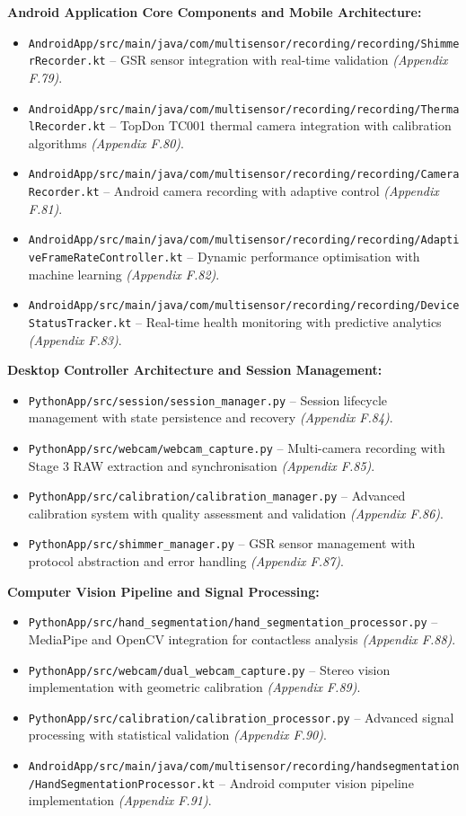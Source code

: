 \documentclass[11pt,a4paper]{report}
\begin{document}
\textbf{Android Application Core Components and Mobile Architecture:}
\begin{itemize}
  \item \texttt{AndroidApp/src/main/java/com/multisensor/recording/recording/ShimmerRecorder.kt} – GSR sensor integration with real-time validation \textit{(Appendix F.79)}.
  \item \texttt{AndroidApp/src/main/java/com/multisensor/recording/recording/ThermalRecorder.kt} – TopDon TC001 thermal camera integration with calibration algorithms \textit{(Appendix F.80)}.
  \item \texttt{AndroidApp/src/main/java/com/multisensor/recording/recording/CameraRecorder.kt} – Android camera recording with adaptive control \textit{(Appendix F.81)}.
  \item \texttt{AndroidApp/src/main/java/com/multisensor/recording/recording/AdaptiveFrameRateController.kt} – Dynamic performance optimisation with machine learning \textit{(Appendix F.82)}.
  \item \texttt{AndroidApp/src/main/java/com/multisensor/recording/recording/DeviceStatusTracker.kt} – Real-time health monitoring with predictive analytics \textit{(Appendix F.83)}.
\end{itemize}

\textbf{Desktop Controller Architecture and Session Management:}
\begin{itemize}
  \item \texttt{PythonApp/src/session/session\_manager.py} – Session lifecycle management with state persistence and recovery \textit{(Appendix F.84)}.
  \item \texttt{PythonApp/src/webcam/webcam\_capture.py} – Multi-camera recording with Stage 3 RAW extraction and synchronisation \textit{(Appendix F.85)}.
  \item \texttt{PythonApp/src/calibration/calibration\_manager.py} – Advanced calibration system with quality assessment and validation \textit{(Appendix F.86)}.
  \item \texttt{PythonApp/src/shimmer\_manager.py} – GSR sensor management with protocol abstraction and error handling \textit{(Appendix F.87)}.
\end{itemize}

\textbf{Computer Vision Pipeline and Signal Processing:}
\begin{itemize}
  \item \texttt{PythonApp/src/hand\_segmentation/hand\_segmentation\_processor.py} – MediaPipe and OpenCV integration for contactless analysis \textit{(Appendix F.88)}.
  \item \texttt{PythonApp/src/webcam/dual\_webcam\_capture.py} – Stereo vision implementation with geometric calibration \textit{(Appendix F.89)}.
  \item \texttt{PythonApp/src/calibration/calibration\_processor.py} – Advanced signal processing with statistical validation \textit{(Appendix F.90)}.
  \item \texttt{AndroidApp/src/main/java/com/multisensor/recording/handsegmentation/HandSegmentationProcessor.kt} – Android computer vision pipeline implementation \textit{(Appendix F.91)}.
\end{itemize}
\end{document}
